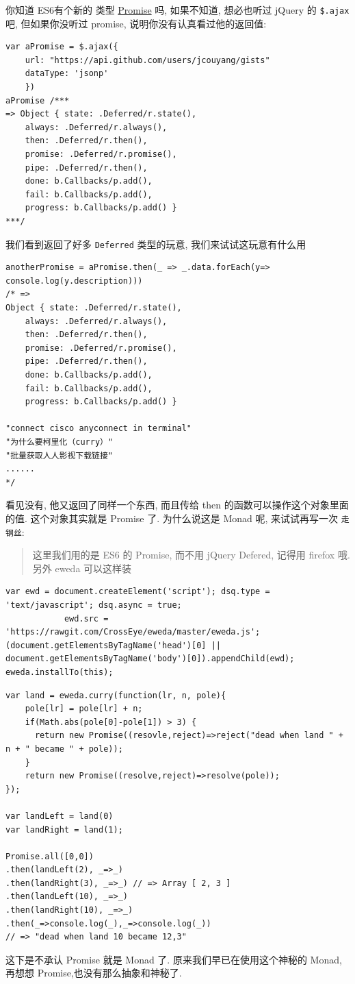 \documentclass[a5paper]{book}
\begin{document}
你知道 ES6有个新的 类型
\href{https://developer.mozilla.org/en-US/docs/Web/JavaScript/Reference/Global_Objects/Promise#Browser_compatibility}{Promise}
吗, 如果不知道, 想必也听过 jQuery 的 \texttt{\$.ajax} 吧, 但如果你没听过 promise,
说明你没有认真看过他的返回值:

\begin{verbatim}
var aPromise = $.ajax({
    url: "https://api.github.com/users/jcouyang/gists"
    dataType: 'jsonp'
    })
aPromise /***
=> Object { state: .Deferred/r.state(),
    always: .Deferred/r.always(),
    then: .Deferred/r.then(),
    promise: .Deferred/r.promise(),
    pipe: .Deferred/r.then(),
    done: b.Callbacks/p.add(),
    fail: b.Callbacks/p.add(),
    progress: b.Callbacks/p.add() }
***/
\end{verbatim}

我们看到返回了好多 \texttt{Deferred} 类型的玩意, 我们来试试这玩意有什么用

\begin{verbatim}
anotherPromise = aPromise.then(_ => _.data.forEach(y=> console.log(y.description)))
/* =>
Object { state: .Deferred/r.state(),
    always: .Deferred/r.always(),
    then: .Deferred/r.then(),
    promise: .Deferred/r.promise(),
    pipe: .Deferred/r.then(),
    done: b.Callbacks/p.add(),
    fail: b.Callbacks/p.add(),
    progress: b.Callbacks/p.add() }

"connect cisco anyconnect in terminal"
"为什么要柯里化（curry）"
"批量获取人人影视下载链接"
......
*/
\end{verbatim}

看见没有, 他又返回了同样一个东西, 而且传给 then
的函数可以操作这个对象里面的值. 这个对象其实就是 Promise 了.
为什么说这是 Monad 呢, 来试试再写一次 \texttt{走钢丝}:

\begin{quote}
这里我们用的是 ES6 的 Promise, 而不用 jQuery Defered, 记得用 firefox
哦. 另外 eweda 可以这样装
\end{quote}

\begin{verbatim}
var ewd = document.createElement('script'); dsq.type = 'text/javascript'; dsq.async = true;
            ewd.src = 'https://rawgit.com/CrossEye/eweda/master/eweda.js';
(document.getElementsByTagName('head')[0] || document.getElementsByTagName('body')[0]).appendChild(ewd);
eweda.installTo(this);
\end{verbatim}

\begin{verbatim}
var land = eweda.curry(function(lr, n, pole){
    pole[lr] = pole[lr] + n;
    if(Math.abs(pole[0]-pole[1]) > 3) {
      return new Promise((resovle,reject)=>reject("dead when land " + n + " became " + pole));
    }
    return new Promise((resolve,reject)=>resolve(pole));
});

var landLeft = land(0)
var landRight = land(1);

Promise.all([0,0])
.then(landLeft(2), _=>_)
.then(landRight(3), _=>_) // => Array [ 2, 3 ]
.then(landLeft(10), _=>_)
.then(landRight(10), _=>_)
.then(_=>console.log(_),_=>console.log(_))
// => "dead when land 10 became 12,3"
\end{verbatim}

这下是不承认 Promise 就是 Monad 了. 原来我们早已在使用这个神秘的 Monad,
再想想 Promise,也没有那么抽象和神秘了.
\end{document}

